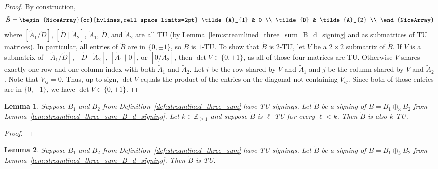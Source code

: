 \documentclass{article}
\newtheorem{lemma}{Lemma}
\theoremstyle{definition}
\begin{document}
\begin{proof}
    By construction,
    \[
        \tilde{B} = \begin{NiceArray}{cc}[hvlines,cell-space-limits=2pt]
            \tilde{A}_{1} & 0 \\
            \tilde{D} & \tilde{A}_{2} \\
        \end{NiceArray}
    \]
    where $[\tilde{A}_{1} / \tilde{D}]$, $[\tilde{D} \mid \tilde{A}_{2}]$, $\tilde{A}_{1}$, $\tilde{D}$, and $\tilde{A}_{2}$ are all TU (by Lemma~\ref{lem:streamlined_three_sum_B_d_signing} and as submatrices of TU matrices). In particular, all entries of $\tilde{B}$ are in $\{0, \pm 1\}$, so $\tilde{B}$ is $1$-TU. To show that $\tilde{B}$ is $2$-TU, let $V$ be a $2 \times 2$ submatrix of $\tilde{B}$. If $V$ is a submatrix of $[\tilde{A}_{1} / \tilde{D}]$, $[\tilde{D} \mid \tilde{A}_{2}]$, $[\tilde{A}_{1} \mid 0]$, or $[0 / \tilde{A}_{2}]$, then $\det V \in \{0, \pm 1\}$, as all of those four matrices are TU. Otherwise $V$ shares exactly one row and one column index with both $\tilde{A}_{1}$ and $\tilde{A}_{2}$. Let $i$ be the row shared by $V$ and $\tilde{A}_{1}$ and $j$ be the column shared by $V$ and $\tilde{A}_{2}$. Note that $V_{ij} = 0$. Thus, up to sign, $\det V$ equals the product of the entries on the diagonal not containing $V_{ij}$. Since both of those entries are in $\{0, \pm 1\}$, we have $\det V \in \{0, \pm 1\}$.
\end{proof}

\begin{lemma}\label{lem:streamlined_three_sum_k_TU_induction}
    Suppose $B_{1}$ and $B_{2}$ from Definition~\ref{def:streamlined_three_sum} have TU signings. Let $\tilde{B}$ be a signing of $B = B_{1} \oplus_{3} B_{2}$ from Lemma~\ref{lem:streamlined_three_sum_B_d_signing}. Let $k \in \mathbb{Z}_{\geq 1}$ and suppose $\tilde{B}$ is $\ell$-TU for every $\ell < k$. Then $\tilde{B}$ is also $k$-TU.
\end{lemma}

\begin{proof}
\end{proof}

\begin{lemma}\label{lem:streamlined_three_sum_regular}
    Suppose $B_{1}$ and $B_{2}$ from Definition~\ref{def:streamlined_three_sum} have TU signings. Let $\tilde{B}$ be a signing of $B = B_{1} \oplus_{3} B_{2}$ from Lemma~\ref{lem:streamlined_three_sum_B_d_signing}. Then $\tilde{B}$ is TU.
\end{lemma}
\end{document}
